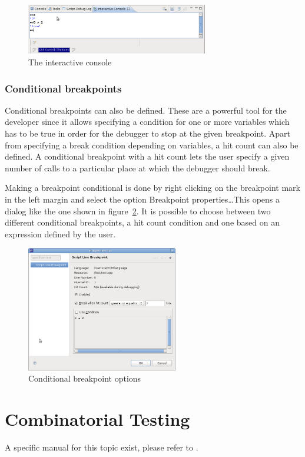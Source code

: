 \begin{figure}[htp]
\begin{center}
  \includegraphics[width=300px]{figures/InteractiveConsole}
  \caption{The interactive console}
  \label{fig:userguide:interactiveConsole}
\end{center}
\end{figure}

\subsubsection{Conditional breakpoints}
\label{sec:userguide:breakpoints}

Conditional breakpoints can also be defined. These are a powerful tool for the
developer since it allows specifying a condition for one or more variables which
has to be true in order for the debugger to stop at the given breakpoint. Apart
from specifying a break condition depending on variables, a hit count can also be
defined. A conditional breakpoint with a hit count lets the user specify a given
number of calls to a particular place at which the debugger should break.

Making a breakpoint conditional is done by right clicking on the breakpoint
mark in the left margin and select the option Breakpoint properties\ldots This
opens a dialog like the one shown in
figure~\ref{fig:userguide:BreakpointConditional}. It is possible to choose
between two different conditional breakpoints, a hit count condition and one
based on an expression defined by the user. 

\begin{figure}[htp]
\begin{center}
  \includegraphics[width=250px]{figures/Breakpointconditional}
  \caption{Conditional breakpoint options}
  \label{fig:userguide:BreakpointConditional}
\end{center}
\end{figure}

\section{Combinatorial Testing}

A specific manual for this topic exist, please refer to \cite{CTManual}.
